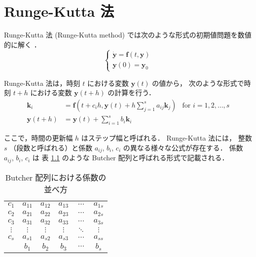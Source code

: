 %

\chapter{Runge-Kutta 法}

Runge-Kutta 法 (Runge-Kutta method) では次のような形式の初期値問題を数値的に解く
\cite{Mitsui1993}．
\begin{equation}
    \begin{cases}
        \dot{\bm{y}} = \bm{f}(t, \bm{y}) \\
        \bm{y}(0) = \bm{y}_0
    \end{cases}
\end{equation}

Runge-Kutta 法は，時刻 $t$ における変数 $\bm{y}(t)$ の値から，
次のような形式で時刻 $t + h$ における変数 $\bm{y}(t + h)$ の計算を行う．
\begin{align}
    \bm{k}_i      & = \bm{f}\left(t + c_i h, \bm{y}(t) + h \sum_{j = 1}^s a_{ij} \bm{k}_j \right)
                  & \text{for $i = 1, 2, \ldots, s$}
    \label{eq:ode_runge-kutta_k-law}                                                              \\
    \bm{y}(t + h) & = \bm{y}(t) + \sum_{i=1}^s b_i \bm{k}_i
    \label{eq:ode_runge-kutta_y-law}
\end{align}

ここで，時間の更新幅 $h$ はステップ幅と呼ばれる．
Runge-Kutta 法には，
整数 $s$ （段数と呼ばれる）と係数 $a_{ij}$, $b_i$, $c_i$ の異なる様々な公式が存在する．
係数 $a_{ij}$, $b_i$, $c_i$ は
表 \ref{table:ode_runge-kutta_butcher-array-general} のような
Butcher 配列と呼ばれる形式で記載される．

\begin{table}[bp]
    \caption{Butcher 配列における係数の並べ方}
    \label{table:ode_runge-kutta_butcher-array-general}
    \centering
    \begin{tabular}{c|ccccc}
        $c_1$    & $a_{11}$ & $a_{12}$ & $a_{13}$ & $\cdots$ & $a_{1s}$ \\
        $c_2$    & $a_{21}$ & $a_{22}$ & $a_{23}$ & $\cdots$ & $a_{2s}$ \\
        $c_3$    & $a_{31}$ & $a_{32}$ & $a_{33}$ & $\cdots$ & $a_{3s}$ \\
        $\vdots$ & $\vdots$ & $\vdots$ & $\vdots$ & $\ddots$ & $\vdots$ \\
        $c_s$    & $a_{s1}$ & $a_{s2}$ & $a_{s3}$ & $\cdots$ & $a_{ss}$ \\
        \hline
                 & $b_1$    & $b_2$    & $b_3$    & $\cdots$ & $b_s$
    \end{tabular}
\end{table}

